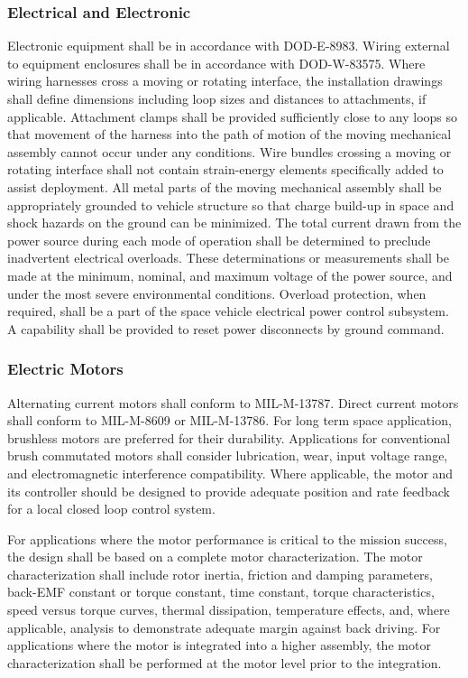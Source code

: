 \documentclass[12pt]{article}
\begin{document}
\subsubsection{Electrical and Electronic} %
Electronic equipment shall be in accordance with DOD-E-8983.
Wiring external to equipment enclosures shall be in accordance with DOD-W-83575.
Where wiring harnesses cross a moving or rotating interface, the installation drawings shall define dimensions including loop sizes and distances to attachments, if applicable. 
Attachment clamps shall be provided sufficiently close to any loops so that movement of the harness into the path of motion of the moving mechanical assembly cannot occur under any conditions. 
Wire bundles crossing a moving or rotating interface shall not contain strain-energy elements specifically added to assist deployment. 
All metal parts of the moving mechanical assembly shall be appropriately grounded to vehicle structure so that charge build-up in space and shock hazards on the ground can be minimized. 
The total current drawn from the power source during each mode of operation shall be determined to preclude inadvertent electrical overloads. 
These determinations or measurements shall be made at the minimum, nominal, and maximum voltage of the power source, and under the most severe environmental conditions. 
Overload protection, when required, shall be a part of the space vehicle electrical power control subsystem. 
A capability shall be provided to reset power disconnects by ground command.

\subsubsection{Electric Motors} %
Alternating current motors shall conform to MIL-M-13787. 
Direct current motors shall conform to MIL-M-8609 or MIL-M-13786. 
For long term space application, brushless motors are preferred for their durability.
Applications for conventional brush commutated motors shall consider lubrication, wear, input voltage range, and electromagnetic interference compatibility. 
Where applicable, the motor and its controller should be designed to provide adequate position and rate feedback for a local closed loop control system.

For applications where the motor performance is critical to the mission success, the design shall be based on a complete motor characterization. 
The motor characterization shall include rotor inertia, friction and damping parameters, back-EMF constant or torque constant, time constant, torque characteristics, speed versus torque curves, thermal dissipation, temperature effects, and, where applicable, analysis to demonstrate adequate margin against back driving.
For applications where the motor is integrated into a higher assembly, the motor characterization shall be performed at the motor level prior to the integration.
\end{document}
